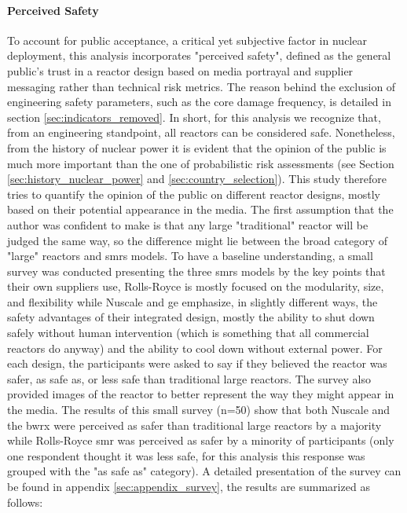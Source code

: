\paragraph{Perceived Safety}
To account for public acceptance, a critical yet subjective factor in nuclear deployment, this analysis incorporates "perceived safety", defined as the general public’s trust in a reactor design based on media portrayal and supplier messaging rather than technical risk metrics. The reason behind the exclusion of engineering safety parameters, such as the core damage frequency, is detailed in section \ref{sec:indicators_removed}. In short, for this analysis we recognize that, from an engineering standpoint, all reactors can be considered safe. Nonetheless, from the history of nuclear power it is evident that the opinion of the public is much more important than the one of probabilistic risk assessments (see Section \ref{sec:history_nuclear_power} and \ref{sec:country_selection}). This study therefore tries to quantify the opinion of the public on different reactor designs, mostly based on their potential appearance in the media. The first assumption that the author was confident to make is that any large "traditional" reactor will be judged the same way, so the difference might lie between the broad category of "large" reactors and \glspl{smr} models. To have a baseline understanding, a small survey was conducted presenting the three \glspl{smr} models by the key points that their own suppliers use, Rolls-Royce is mostly focused on the modularity, size, and flexibility while Nuscale and \gls{ge} emphasize, in slightly different ways,  the safety advantages of their integrated design, mostly the ability to shut down safely without human intervention (which is something that all commercial reactors do anyway) and the ability to cool down without external power. For each design, the participants were asked to say if they believed the reactor was safer, as safe as, or less safe than traditional large reactors. The survey also provided images of the reactor to better represent the way they might appear in the media. The results of this small survey (n=50) show that both Nuscale and the \gls{bwrx} were perceived as safer than traditional large reactors by a majority while Rolls-Royce \gls{smr} was perceived as safer by a minority of participants (only one respondent thought it was less safe, for this analysis this response was grouped with the "as safe as" category). A detailed presentation of the survey can be found in appendix \ref{sec:appendix_survey}, the results are summarized as follows:

